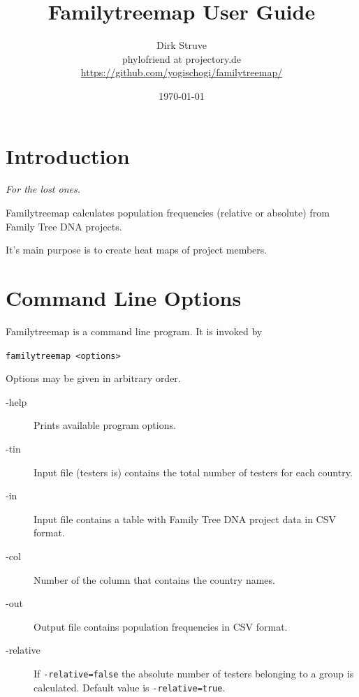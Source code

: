 \documentclass[12pt,a4paper]{article}
\begin{document}
\title{Familytreemap User Guide}
\author{Dirk Struve\\
phylofriend at projectory.de\\
\href{https://github.com/yogischogi/familytreemap/}{https://github.com/yogischogi/familytreemap/}}
\date{\today}
\maketitle
\tableofcontents


\section{Introduction}

\hfill {\sl For the lost ones.}
\vspace{1em}

\noindent
Familytreemap calculates population frequencies
(relative or absolute) from Family Tree DNA projects.

It's main purpose is to create heat maps of project members.


\section{Command Line Options}

Familytreemap is a command line program. It is invoked by

\vspace{1em}
\noindent\texttt{familytreemap <options>}

\vspace{1em}
\noindent Options may be given in arbitrary order.

\begin{description}
\item[-help] Prints available program options.
\item[-tin] Input file (testers is) contains the total
  number of testers for each country.
\item[-in] Input file contains a table with Family Tree DNA
  project data in CSV format.
\item[-col] Number of the column that contains the country names.
\item[-out] Output file contains population frequencies in
  CSV format.
\item[-relative] If \texttt{-relative=false} the absolute
  number of testers belonging to a group is calculated.
  Default value is \texttt{-relative=true}.
\end{description}
\end{document}
